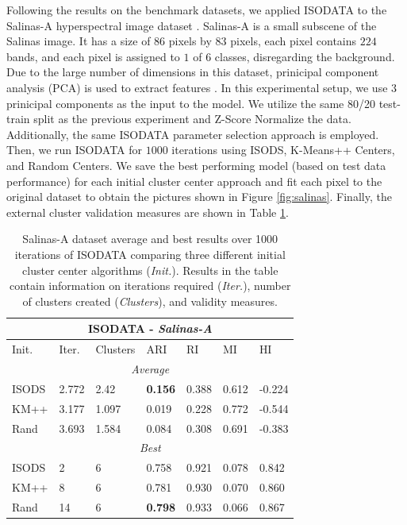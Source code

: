 \documentclass[a4paper,10pt]{article}
\begin{document}
Following the results on the benchmark datasets, we applied ISODATA to the
Salinas-A hyperspectral image dataset \cite{Salinas}. Salinas-A is a small
subscene of the Salinas image. It has a size of $86$ pixels by $83$ pixels, each
pixel contains $224$ bands, and each pixel is assigned to $1$ of $6$ classes,
disregarding the background. Due to the large number of dimensions in this
dataset, prinicipal component analysis (PCA) is used to extract features
\cite{Rodarmel2002}. In this experimental setup, we use $3$ prinicipal
components as the input to the model. We utilize the same 80/20 test-train split
as the previous experiment and Z-Score Normalize the data. Additionally, the
same ISODATA parameter selection approach is employed. Then, we run ISODATA for
$1000$ iterations using ISODS, K-Means++ Centers, and Random Centers. We save
the best performing model (based on test data performance) for each initial
cluster center approach and fit each pixel to the original dataset to obtain the
pictures shown in Figure \ref{fig:salinas}. Finally, the external cluster
validation measures are shown in Table \ref{tab:salinastable}. 

\begin{table}[ht]
      \begin{tabular}{ |p{1.25cm}||p{1.25cm} p{1.25cm} p{1.25cm} p{1.25cm} p{1.25cm} p{1.25cm}|}
            \hline
            \multicolumn{7}{|c|}{\textbf{ISODATA} - \textit{Salinas-A}}        \\
            \hline
            Init. & Iter. & Clusters & ARI            & RI    & MI    & HI     \\
            \hline
            \multicolumn{7}{|c|}{\textit{Average}}                             \\[1ex]
            ISODS & 2.772 & 2.42     & \textbf{0.156} & 0.388 & 0.612 & -0.224 \\
            KM++  & 3.177 & 1.097    & 0.019          & 0.228 & 0.772 & -0.544 \\
            Rand  & 3.693 & 1.584    & 0.084          & 0.308 & 0.691 & -0.383 \\
            \hline
            \multicolumn{7}{|c|}{\textit{Best}}                                \\[1ex]
            ISODS & 2     & 6        & 0.758          & 0.921 & 0.078 & 0.842  \\
            KM++  & 8     & 6        & 0.781          & 0.930 & 0.070 & 0.860  \\
            Rand  & 14    & 6        & \textbf{0.798} & 0.933 & 0.066 & 0.867  \\
            \hline
      \end{tabular}
      \caption{Salinas-A dataset average and best results over 1000 iterations
            of ISODATA comparing three different initial cluster center
            algorithms (\textit{Init.}). Results in the table contain
            information on iterations required (\textit{Iter.}), number of
            clusters created (\textit{Clusters}), and validity measures.}
      \label{tab:salinastable}
\end{table}
\end{document}
